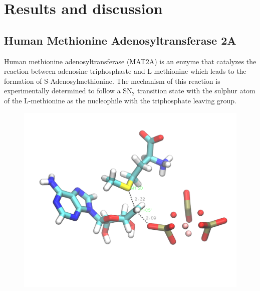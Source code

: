 \documentclass[journal=jpcbfk,manuscript=article,layout=traditional]{achemso}
\begin{document}
\section{Results and discussion}
\subsection{Human Methionine Adenosyltransferase 2A}
Human methionine adenosyltransferase (MAT2A) is an enzyme that catalyzes the 
reaction between adenosine triphosphaste and L-methionine which leads to the 
formation of S-Adenosylmethionine. \cite{Firestone17JAmChemSoc139p13754,Niland21Biochem60p791} 
The mechanism of this reaction is experimentally determined to follow a 
SN$_2$ transition state with the sulphur atom of the L-methionine as the 
nucleophile with the triphosphate leaving group.  

\begin{figure}[ht!]
\includegraphics[scale=0.25]{figures/mat2a-transition-state.png}
\end{figure}
\end{document}
